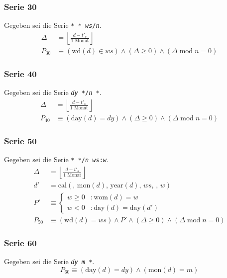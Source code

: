 \documentclass[a4paper]{article}
\newcommand*{\dayf}{\mathrm{day}}
\newcommand*{\monf}{\mathrm{mon}}
\newcommand*{\yearf}{\mathrm{year}}
\newcommand*{\wdf}{\mathrm{wd}}
\newcommand*{\womf}{\mathrm{wom}}
\newcommand*{\calf}{\mathrm{cal}}
\renewcommand{\mod}{\;\mathrm{mod}\;}
\numberwithin{equation}{section}
\begin{document}
\subsubsection{Serie 30}
Gegeben sei die Serie \texttt{* * \textit{ws}/\textit{n}}.
\begin{equation}
\begin{split}
  \Delta & = \left\lfloor\frac{d - t'_s}{1 \textrm{ Monat}}\right\rfloor \\
  P_{30} & \equiv (\wdf(d) \in ws) \wedge (\Delta \ge 0) \wedge (\Delta \mod n = 0)
\end{split}
\end{equation}

\subsubsection{Serie 40}
Gegeben sei die Serie \texttt{\textit{dy} */\textit{n} *}.
\begin{equation}
\begin{split}
  \Delta & = \left\lfloor\frac{d - t'_s}{1 \textrm{ Monat}}\right\rfloor \\
  P_{40} & \equiv (\dayf(d) = dy) \wedge (\Delta \ge 0) \wedge (\Delta \mod n = 0)
\end{split}
\end{equation}

\subsubsection{Serie 50}
Gegeben sei die Serie \texttt{* */\textit{n} \textit{ws}:\textit{w}}.
\begin{equation}
\begin{split}
  \Delta & = \left\lfloor\frac{d - t'_s}{1 \textrm{ Monat}}\right\rfloor \\
  d' & = \calf(,\,\monf(d),\,\yearf(d),\,ws,\,,\,w) \\
  P' & \equiv \left\{\begin{array}{ll}
      w \ge 0 & : \womf(d) = w \\
      w < 0 & : \dayf(d) = \dayf(d')
    \end{array}\right. \\
  P_{50} & \equiv (\wdf(d) = ws) \wedge P' \wedge
    (\Delta \ge 0) \wedge (\Delta \mod n = 0)
\end{split}
\end{equation}

\subsubsection{Serie 60}
Gegeben sei die Serie \texttt{\textit{dy} \textit{m} *}.
\begin{equation}
  P_{60} \equiv (\dayf(d) = dy) \wedge (\monf(d) = m)
\end{equation}
\end{document}
